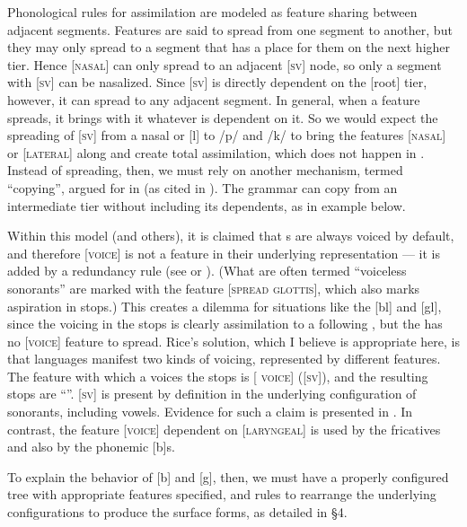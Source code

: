 \documentclass[output=paper]{LSP/langsci}
\begin{document}
Phonological rules for assimilation are modeled as feature sharing between adjacent segments. Features are said to spread from one segment to another, but they may only spread to a segment that has a place for them on the next higher tier. Hence [\textsc{nasal}] can only spread to an adjacent [\textsc{sv}] node, so only a segment with [\textsc{sv}] can be nasalized. Since [\textsc{sv}] is directly dependent on the [root] tier, however, it can spread to any adjacent segment. In general, when a feature spreads, it brings with it whatever is dependent on it. So we would expect the spreading of [\textsc{sv}] from a nasal or [l] to /p/ and /k/ to bring the features [\textsc{nasal}] or [\textsc{lateral}] along and create total assimilation, which does not happen in . Instead of spreading, then, we must rely on another mechanism, termed ``copying'', argued for in \citet{RiceAvery1991} (as cited in \citealt[316]{Rice1993}). The grammar can copy from an intermediate tier without including its dependents, as in example  below.

Within this model (and others), it is claimed that s are always voiced by default, and therefore [\textsc{voice}] is not a feature in their underlying representation --- it is added by a redundancy rule (see \citealt[175, 177]{Botma2011} or \citealt[105]{Szigetvari2008}). (What are often termed ``voiceless sonorants'' are marked with the feature [\textsc{spread glottis}], which also marks aspiration in stops.) This creates a dilemma for situations like the  [bl] and [gl], since the voicing in the stops is clearly assimilation to a following , but the  has no [\textsc{voice}] feature to spread. Rice's solution, which I believe is appropriate here, is that languages manifest two kinds of voicing, represented by different features. The feature with which a  voices the  stops is [\textsc{ voice}] ([\textsc{sv}]), and the resulting stops are ``''. [\textsc{sv}] is present by definition in the underlying configuration of sonorants, including vowels. Evidence for such a claim is presented in \citet{Rice1993,Rice2013}. In contrast, the feature [\textsc{voice}] dependent on [\textsc{laryngeal}] is used by the fricatives and also by the phonemic [b]s.

To explain the behavior of [b] and [g], then, we must have a properly configured tree with appropriate features specified, and rules to rearrange the underlying configurations to produce the surface forms, as detailed in \S 4.
\end{document}
